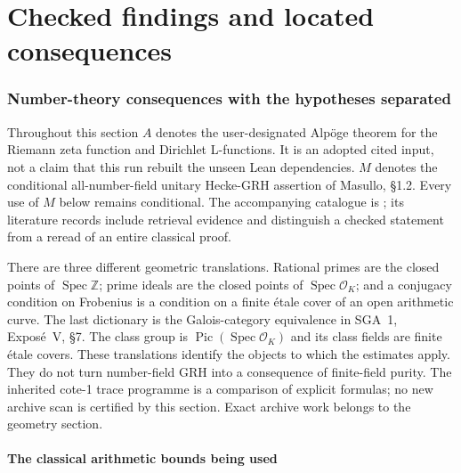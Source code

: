 \documentclass[11pt,a4paper]{article}
\begin{document}
\part{Checked findings and located consequences}

\section{Number-theory consequences with the hypotheses separated}
\label{sec:number-theory}

Throughout this section $A$ denotes the user-designated Alp\"oge theorem
for the Riemann zeta function and Dirichlet L-functions.  It is an adopted
cited input, not a claim that this run rebuilt the unseen Lean dependencies.
$M$ denotes the conditional all-number-field unitary Hecke-GRH assertion
of Masullo, \S1.2.  Every use of $M$ below remains conditional.  The
accompanying catalogue is ; its
literature records include retrieval evidence and distinguish a checked
statement from a reread of an entire classical proof.

There are three different geometric translations.  Rational primes are
the closed points of $\operatorname{Spec}\mathbb Z$; prime ideals are the
closed points of $\operatorname{Spec}\mathcal O_K$; and a conjugacy condition
on Frobenius is a condition on a finite \'{e}tale cover of an open arithmetic
curve.  The last dictionary is the Galois-category equivalence in SGA~1,
Expos\'e~V, \S7.  The class group is
$\operatorname{Pic}(\operatorname{Spec}\mathcal O_K)$ and its class fields
are finite \'{e}tale covers.  These translations identify the objects to
which the estimates apply.  They do not turn number-field GRH into a
consequence of finite-field purity.  The inherited cote-1 trace programme
is a comparison of explicit formulas; no new archive scan is certified by
this section.  Exact archive work belongs to the geometry section.

\subsection{The classical arithmetic bounds being used}
\end{document}
